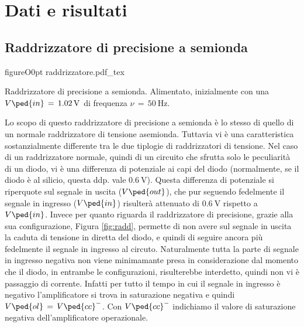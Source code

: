 \section*{Dati e risultati}

\subsection*{Raddrizzatore di precisione a semionda}

\begin{wrapfloat}{figure}{O}{0pt}
        \def\svgwidth{0.45\textwidth}
        {raddrizzatore.pdf_tex}
        \caption{Raddrizzatore di precisione a semionda. Alimentato, inizialmente con una $V\ped{in}\,=\,\SI{1.02}{\volt}$ di frequenza $\nu\,=\,\SI{50}{\hertz}$.}
        \label{fig:radd}
\end{wrapfloat}

Lo scopo di questo raddrizzatore di precisione a semionda è lo stesso di quello di un normale raddrizzatore di tensione asemionda. Tuttavia vi è una caratteristica sostanzialmente differente tra le due tiplogie di raddrizzatori di tensione. Nel caso di un raddrizzatore normale, quindi di un circuito che sfrutta solo le peculiarità di un diodo, vi è una differenza di potenziale ai capi del diodo (normalmente, se il diodo è al silicio, questa ddp. vale $\SI{0.6}{\volt}$). Questa differenza di potenziale si riperquote sul segnale in uscita ($V\ped{out}$), che pur seguendo fedelmente il segnale in ingresso ($V\ped{in}$) risulterà attenuato di $\SI{0.6}{\volt}$ rispetto a $V\ped{in}$.
Invece per quanto riguarda il raddrizzatore di precisione, grazie alla sua configurazione, Figura \ref{fig:radd}, permette di non avere sul segnale in uscita la caduta di tensione in diretta del diodo, e quindi di seguire ancora più fedelmente il segnale in ingresso al circuto.
Naturalmente tutta la parte di segnale in ingresso negativa non viene minimamante presa in considerazione dal momento che il diodo, in entrambe le configurazioni, risulterebbe interdetto, quindi non vi è passaggio di corrente. Infatti per tutto il tempo in cui il segnale in ingresso è negativo l'amplificatore si trova in saturazione negativa e quindi $V\ped{ol}\,=\,V\ped{cc}^-$. Con $V\ped{cc}^-$ indichiamo il valore di saturazione negativa dell'amplificatore operazionale.

